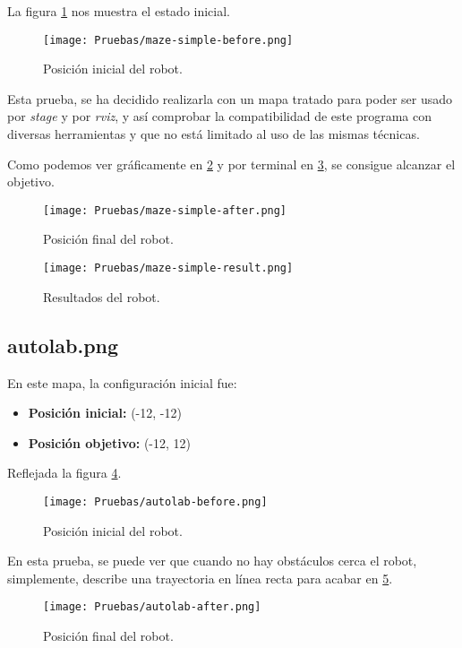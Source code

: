\documentclass[a4paper, 11pt]{article}
\begin{document}
		La figura \ref{begin-ms} nos muestra el estado inicial.
		
		\begin{figure}[H]
			\centering
			\texttt{[image: Pruebas/maze-simple-before.png]}
			\caption{Posición inicial del robot.}
			\label{begin-ms}	
		\end{figure}
		
		Esta prueba, se ha decidido realizarla con un mapa tratado para poder ser usado por \textit{stage}
		y por \textit{rviz}, y así comprobar la compatibilidad de este programa con diversas herramientas
		y que no está limitado al uso de las mismas técnicas.

		Como podemos ver gráficamente en \ref{end-ms} y por terminal en \ref{res-ms}, se consigue alcanzar
		el objetivo.

		\begin{figure}[H]
			\centering
			\texttt{[image: Pruebas/maze-simple-after.png]}
			\caption{Posición final del robot.}
			\label{end-ms}	
		\end{figure}
		
		\begin{figure}[H]
			\centering
			\texttt{[image: Pruebas/maze-simple-result.png]}
			\caption{Resultados del robot.}
			\label{res-ms}	
		\end{figure}
		
	
	\subsection{autolab.png}
		En este mapa, la configuración inicial fue:
	
		\begin{itemize}
			\item \textbf{Posición inicial:} (-12, -12)
			\item \textbf{Posición objetivo:} (-12, 12)
		\end{itemize}
		
		Reflejada la figura \ref{begin-a}.
		
		\begin{figure}[H]
			\centering
			\texttt{[image: Pruebas/autolab-before.png]}
			\caption{Posición inicial del robot.}
			\label{begin-a}	
		\end{figure}
		
		En esta prueba, se puede ver que cuando no hay obstáculos cerca el robot, simplemente, describe
		una trayectoria en línea recta para acabar en \ref{end-a}.		
		
		\begin{figure}[H]
			\centering
			\texttt{[image: Pruebas/autolab-after.png]}
			\caption{Posición final del robot.}
			\label{end-a}	
		\end{figure}
\end{document}
